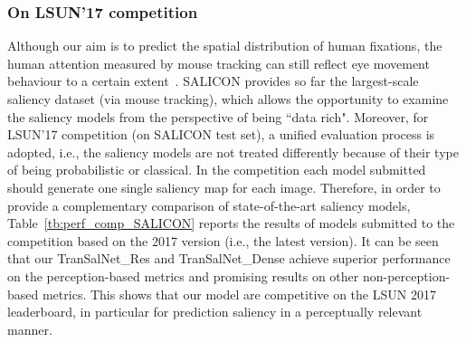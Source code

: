 \documentclass{article}
\begin{document}
\subsubsection{On LSUN’17 competition}
Although our aim is to predict the spatial distribution of human fixations, the human attention measured by mouse tracking can still reflect eye movement behaviour to a certain extent~\cite{salicon2015}. SALICON provides so far the largest-scale saliency dataset (via mouse tracking), which allows the opportunity to examine the saliency models from the perspective of being ``data rich". Moreover, for LSUN’17 competition (on SALICON test set), a unified evaluation process is adopted, i.e., the saliency models are not treated differently because of their type of being probabilistic or classical. In the competition each model submitted should generate one single saliency map for each image. Therefore, in order to provide a complementary comparison of state-of-the-art saliency models, Table~\ref{tb:perf_comp_SALICON} reports the results of models submitted to the competition based on the 2017 version (i.e., the latest version). It can be seen that our TranSalNet\_Res and TranSalNet\_Dense achieve superior performance on the perception-based metrics and promising results on other non-perception-based metrics. This shows that our model are competitive on the LSUN 2017 leaderboard, in particular for prediction saliency in a perceptually relevant manner. 
\end{document}
